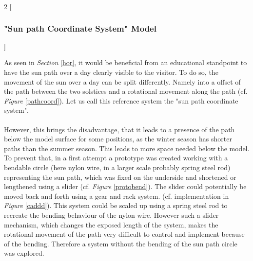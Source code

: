 \documentclass[a4paper,9pt]{article}
\begin{document}
    \begin{multicols}{2}
    [
    \subsubsection{"Sun path Coordinate System" Model }
    ]

    As seen in \textit{Section} \ref{hor}, it would be beneficial from an educational standpoint to have the sun path over a day clearly visible to the visitor. To do so, the movement of the sun over a day can be split differently. Namely into a offset of the path between the two solstices and a rotational movement along the path (cf. \textit{Figure} \ref{pathcoord}). Let us call this reference system the "sun path coordinate system".\\
    \\
    However, this brings the disadvantage, that it leads to a presence of the path below the model surface for some positions, as the winter season has shorter paths than the summer season. This leads to more space needed below the model. To prevent that, in a first attempt a prototype was created working with a bendable circle (here nylon wire, in a larger scale probably spring steel rod) representing the sun path, which was fixed on the underside and shortened or lengthened using a slider (cf. \textit{Figure} \ref{protobend}). The slider could potentially be moved back and forth using a gear and rack system. (cf. implementation in \textit{Figure} \ref{caddd}). This system could be scaled up using a spring steel rod to recreate the bending behaviour of the nylon wire. However such a slider mechanism, which changes the exposed length of the system, makes the rotational movement of the path very difficult to control and implement because of the bending. Therefore a system without the bending of the sun path circle was explored.

   
    \end{multicols}
\end{document}
